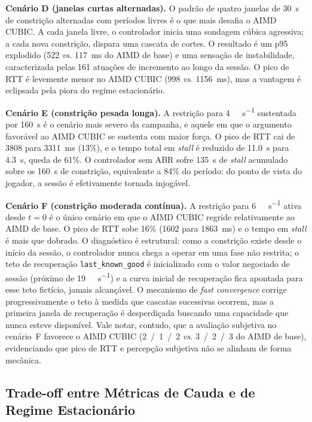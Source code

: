 \textbf{Cenário D (janelas curtas alternadas).} O padrão de
quatro janelas de \SI{30}{\second} de constrição alternadas
com períodos livres é o que mais desafia o AIMD CUBIC. A cada
janela livre, o controlador inicia uma sondagem cúbica
agressiva; a cada nova constrição, dispara uma cascata de
cortes. O resultado é um p95 explodido (522 \emph{vs.} 117~ms
do AIMD de base) e uma sensação de instabilidade,
caracterizada pelas 161 atuações de incremento ao longo da
sessão. O pico de RTT é levemente menor no AIMD CUBIC (998
\emph{vs.} 1156~ms), mas a vantagem é eclipsada pela piora
do regime estacionário.

\textbf{Cenário E (constrição pesada longa).} A restrição
para \SI{4}{\mega\bit\per\second} sustentada por
\SI{160}{\second} é o cenário mais severo da campanha, e
aquele em que o argumento favorável ao AIMD CUBIC se
sustenta com maior força. O pico de RTT cai de 3808 para
3311~ms (13\%), e o tempo total em \emph{stall} é reduzido de
\SI{11.0}{\second} para \SI{4.3}{\second}, queda de 61\%. O
controlador sem ABR sofre \SI{135}{\second} de \emph{stall}
acumulado sobre os \SI{160}{\second} de constrição, equivalente
a 84\% do período: do ponto de vista do jogador, a sessão é
efetivamente tornada injogável.

\textbf{Cenário F (constrição moderada contínua).} A
restrição para \SI{6}{\mega\bit\per\second} ativa desde
$t=0$ é o único cenário em que o AIMD CUBIC regride
relativamente ao AIMD de base. O pico de RTT sobe 16\%
(1602 para 1863~ms) e o tempo em \emph{stall} é mais que
dobrado. O diagnóstico é estrutural: como a constrição existe
desde o início da sessão, o controlador nunca chega a operar
em uma fase não restrita; o teto de recuperação
\texttt{last\_known\_good} é inicializado com o valor
negociado de sessão (próximo de \SI{19}{\mega\bit\per\second})
e a curva inicial de recuperação fica apontada para esse teto
fictício, jamais alcançável. O mecanismo de \emph{fast
convergence} corrige progressivamente o teto à medida que
cascatas sucessivas ocorrem, mas a primeira janela de
recuperação é desperdiçada buscando uma capacidade que nunca
esteve disponível. Vale notar, contudo, que a avaliação
subjetiva no cenário~F favorece o AIMD CUBIC (2~/~1~/~2
\emph{vs.} 3~/~2~/~3 do AIMD de base), evidenciando que pico
de RTT e percepção subjetiva não se alinham de forma
mecânica.

\subsection{Trade-off entre Métricas de Cauda e de Regime Estacionário}

